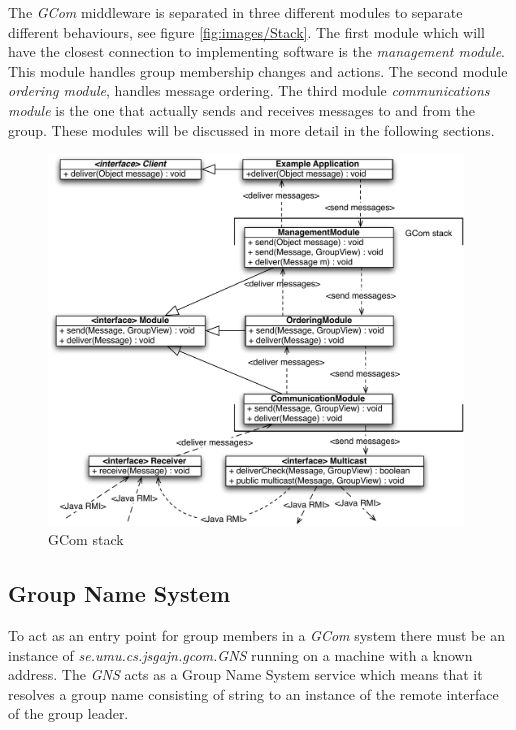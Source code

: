\documentclass[titlepage, twocolumn, a4paper, 10pt]{article}
\begin{document}
The \textit{GCom} middleware is separated in three different modules
to separate different behaviours, see figure \vref{fig:images/Stack}.
The first module which will have the closest connection to
implementing software is the \textit{management module}. This module
handles group membership changes and actions. The second module
\textit{ordering module}, handles message ordering. The third module
\textit{communications module} is the one that actually sends and
receives messages to and from the group. These modules will be
discussed in more detail in the following sections.


\begin{figure}[!thb]
  \centerline{\includegraphics[width=110mm]{images/Stack.pdf}}
  \caption{GCom stack}
  \label{fig:images/Stack}
\end{figure}

\subsection{Group Name System}\label{sec:group-name-system}
To act as an entry point for group members in a \textit{GCom} system
there must be an instance of \textit{se.umu.cs.jsgajn.gcom.GNS}
running on a machine with a known address. The \textit{GNS} acts as a
Group Name System service which means that it resolves a group name
consisting of string to an instance of the remote interface of the
group leader.
\end{document}
